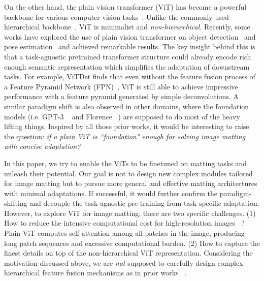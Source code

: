\documentclass[10pt,twocolumn,letterpaper]{article}
\begin{document}
On the other hand, the plain vision transformer (ViT) has become a powerful backbone for various computer vision tasks~\cite{vit, vitdet, vitpose}. Unlike the commonly used hierarchical backbone~\cite{res, swin}, ViT is minimalist and \emph{non-hierarchical}. Recently, some works have explored the use of plain vision transformer on object detection~\cite{vitdet} and pose estimation~\cite{vitpose} and achieved remarkable results. The key insight behind this is that a task-agnostic pretrained transformer structure could already encode rich enough semantic representation which simplifies the adaptation of downstream tasks. For example, ViTDet \cite{vitdet} finds that even without the feature fusion process of a Feature Pyramid Network (FPN)~\cite{fpn}, ViT is still able to achieve impressive performance with a feature pyramid generated by simple deconvolutions. A similar paradigm shift is also observed in other domains, where the foundation models (i.e. GPT-3 ~\cite{GPT3} and Florence ~\cite{Florence}) are supposed to do most of the heavy lifting things. Inspired by all those prior works, it would be interesting to raise the question: \emph{if a plain ViT is ``foundation" enough for solving image matting with concise adaptation?}

In this paper, we try to enable the ViTs to be finetuned on matting tasks and unleash their potential. Our goal is not to design new complex modules tailored for image matting but to pursue more general and effective matting architectures with minimal adaptations. If successful, it would further confirm the paradigm-shifting and decouple the task-agnostic pre-training from task-specific adaptation. However, to explore ViT for image matting, there are two specific challenges. (1) How to reduce the intensive computational cost for high-resolution images ~\cite{HDMatt}? Plain ViT computes self-attention among all patches in the image, producing long patch sequences and excessive computational burden. (2) How to capture the finest details on top of the non-hierarchical ViT representation. Considering the motivation discussed above, we are \emph{not} supposed to carefully design complex hierarchical feature fusion mechanisms as in prior works ~\cite{GCAMatting, MGM, matteformer, sim}.
\end{document}
